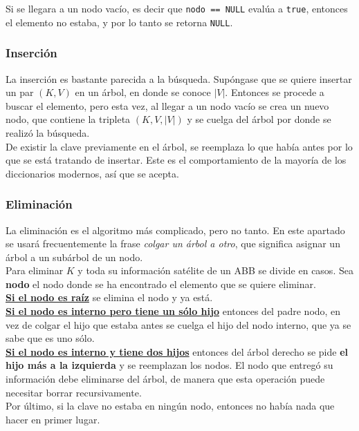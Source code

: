 \documentclass[12pt,letterpaper]{report}
\begin{document}
Si se llegara a un nodo vacío, es decir que \texttt{nodo == NULL} evalúa a \texttt{true}, entonces el elemento no estaba, y por lo tanto se retorna \texttt{NULL}.

\subsubsection{Inserción}
La inserción es bastante parecida a la búsqueda. Supóngase que se quiere insertar un par $(K,V)$ en un árbol, en donde se conoce $|V|$. Entonces se procede a buscar el elemento, pero esta vez, al llegar a un nodo vacío se crea un nuevo nodo, que contiene la tripleta $(K, V, |V|)$ y se cuelga del árbol por donde se realizó la búsqueda.\\

De existir la clave previamente en el árbol, se reemplaza lo que había antes por lo que se está tratando de insertar. Este es el comportamiento de la mayoría de los diccionarios modernos, así que se acepta.

\subsubsection{Eliminación}
La eliminación es el algoritmo más complicado, pero no tanto. En este apartado se usará frecuentemente la frase \emph{colgar un árbol a otro}, que significa asignar un árbol a un subárbol de un nodo.\\

Para eliminar $K$ y toda su información satélite de un ABB se divide en casos. Sea \textbf{nodo} el nodo donde se ha encontrado el elemento que se quiere eliminar.\\

\noindent \textbf{\underline{Si el nodo es raíz}} se elimina el nodo y ya está.\\
\textbf{\underline{Si el nodo es interno pero tiene un sólo hijo}} entonces del padre nodo, en vez de colgar el hijo que estaba antes se cuelga el hijo del nodo interno, que ya se sabe que es uno sólo. \\
\textbf{\underline{Si el nodo es interno y tiene dos hijos}} entonces del árbol derecho se pide \textbf{el hijo más a la izquierda} y se reemplazan los nodos. El nodo que entregó su información debe eliminarse del árbol, de manera que esta operación puede necesitar borrar recursivamente.\\

Por último, si la clave no estaba en ningún nodo, entonces no había nada que hacer en primer lugar.
\end{document}
